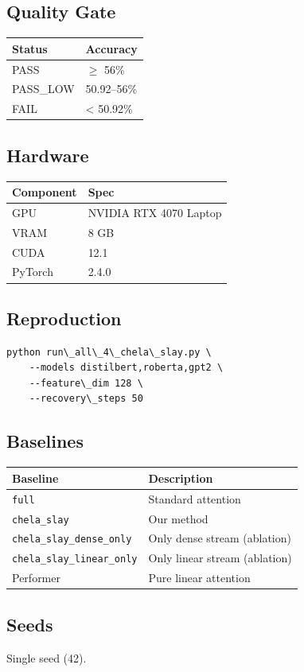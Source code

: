 \subsection{Quality Gate}

\begin{table}[H]
\centering
\small
\begin{tabular}{ll}
\toprule
\textbf{Status} & \textbf{Accuracy} \\
\midrule
PASS & $\ge$ 56\% \\
PASS\_LOW & 50.92--56\% \\
FAIL & \textless{} 50.92\% \\
\bottomrule
\end{tabular}
\end{table}

\subsection{Hardware}

\begin{table}[H]
\centering
\small
\begin{tabular}{ll}
\toprule
\textbf{Component} & \textbf{Spec} \\
\midrule
GPU & NVIDIA RTX 4070 Laptop \\
VRAM & 8 GB \\
CUDA & 12.1 \\
PyTorch & 2.4.0 \\
\bottomrule
\end{tabular}
\end{table}

\subsection{Reproduction}

\begin{lstlisting}
python run\_all\_4\_chela\_slay.py \
    --models distilbert,roberta,gpt2 \
    --feature\_dim 128 \
    --recovery\_steps 50
\end{lstlisting}

\subsection{Baselines}

\begin{table}[H]
\centering
\small
\begin{tabular}{ll}
\toprule
\textbf{Baseline} & \textbf{Description} \\
\midrule
\texttt{full} & Standard attention \\
\texttt{chela\_slay} & Our method \\
\texttt{chela\_slay\_dense\_only} & Only dense stream (ablation) \\
\texttt{chela\_slay\_linear\_only} & Only linear stream (ablation) \\
Performer & Pure linear attention \\
\bottomrule
\end{tabular}
\end{table}

\subsection{Seeds}

Single seed (42).

